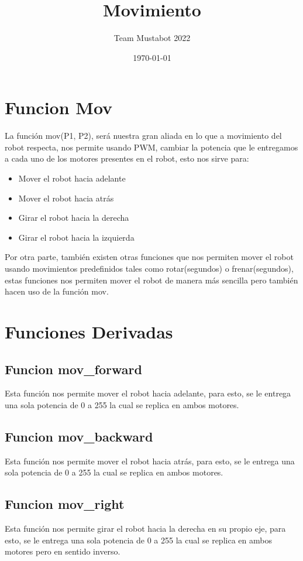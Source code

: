 \documentclass[12pt]{article}
\title{Movimiento}
\author{Team Mustabot 2022}
\date{\today}
\begin{document}
\maketitle

\section*{Funcion Mov}
La función mov(P1, P2), será nuestra gran aliada en lo que a movimiento del robot respecta, nos permite usando
PWM, cambiar la potencia que le entregamos a cada uno de los motores presentes en el robot, esto nos sirve para:
\begin{itemize}
    \item Mover el robot hacia adelante
    \item Mover el robot hacia atrás
    \item Girar el robot hacia la derecha
    \item Girar el robot hacia la izquierda
\end{itemize}
Por otra parte, también existen otras funciones que nos permiten mover el robot usando movimientos predefinidos
tales como rotar(segundos) o frenar(segundos), estas funciones nos permiten mover el robot de manera más sencilla
pero también hacen uso de la función mov.

\section*{Funciones Derivadas}

\subsection*{Funcion mov\_forward}
Esta función nos permite mover el robot hacia adelante, para esto, se le entrega una sola potencia de 0 a 255 la cual se replica en ambos motores.

\subsection*{Funcion mov\_backward}
Esta función nos permite mover el robot hacia atrás, para esto, se le entrega una sola potencia de 0 a 255 la cual se replica en ambos motores.

\subsection*{Funcion mov\_right}
Esta función nos permite girar el robot hacia la derecha en su propio eje, para esto, se le entrega una sola potencia de 0 a 255 la cual se replica en ambos motores pero en sentido inverso.
\end{document}
